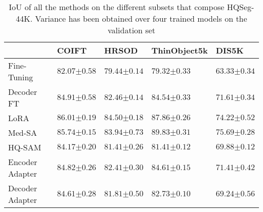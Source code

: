 
\begin{table*}[]
\centering
\caption{IoU of all the methods on the different subsets that compose HQSeg-44K. Variance has been obtained over four trained models on the validation set}
\label{tab:hqseg_results_samda}
\begin{tabular}{@{}lP{2.2cm}P{2.2cm}P{2.2cm}P{2.2cm}@{}}
\toprule
 & COIFT & HRSOD & ThinObject5k & DIS5K \\ \midrule
Fine-Tuning & $82.07{\scriptscriptstyle \pm 0.58}$ & $79.44{\scriptscriptstyle \pm 0.14}$ & $79.32{\scriptscriptstyle \pm 0.33}$ & $63.33{\scriptscriptstyle \pm 0.34}$ \\
Decoder FT & $84.91{\scriptscriptstyle \pm 0.58}$ & $82.46{\scriptscriptstyle \pm 0.14}$ & $84.54{\scriptscriptstyle \pm 0.33}$ & $71.61{\scriptscriptstyle \pm 0.34}$ \\
LoRA & $86.01{\scriptscriptstyle \pm 0.19}$ & $84.50{\scriptscriptstyle \pm 0.18}$ & $87.86{\scriptscriptstyle \pm 0.26}$ & $74.22{\scriptscriptstyle \pm 0.52}$ \\
Med-SA & $85.74{\scriptscriptstyle \pm 0.15}$ & $83.94{\scriptscriptstyle \pm 0.73}$ & $89.83{\scriptscriptstyle \pm 0.31}$ & $75.69{\scriptscriptstyle \pm 0.28}$ \\
HQ-SAM & $84.17{\scriptscriptstyle \pm 0.20}$ & $81.41{\scriptscriptstyle \pm 0.26}$ & $81.41{\scriptscriptstyle \pm 0.12}$ & $69.88{\scriptscriptstyle \pm 0.12}$ \\ \midrule
Encoder Adapter & $84.82{\scriptscriptstyle \pm 0.26}$ & $82.41{\scriptscriptstyle \pm 0.30}$ & $84.61{\scriptscriptstyle \pm 0.15}$ & $71.41{\scriptscriptstyle \pm 0.42}$ \\
Decoder Adapter & $84.61{\scriptscriptstyle \pm 0.28}$ & $81.81{\scriptscriptstyle \pm 0.50}$ & $82.73{\scriptscriptstyle \pm 0.10}$ & $69.24{\scriptscriptstyle \pm 0.56}$ \\ \bottomrule
\end{tabular}

\end{table*}